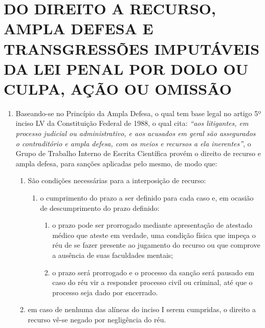 \chapter{DO DIREITO A RECURSO, AMPLA DEFESA E TRANSGRESSÕES IMPUTÁVEIS DA LEI PENAL POR DOLO OU CULPA, AÇÃO OU OMISSÃO}

\begin{enumerate}[resume, label=Art. \arabic*] %

\item Baseando-se no Princípio da Ampla Defesa, o qual tem base legal no artigo 5º inciso LV da Constituição Federal de 1988, o qual cita: \textit{“aos litigantes, em processo judicial ou administrativo, e aos acusados em geral são assegurados o contraditório e ampla defesa, com os meios e recursos a ela inerentes”}, o Grupo de Trabalho Interno de Escrita Científica provém o direito de recurso e ampla defesa, para sanções aplicadas pelo mesmo, de modo que:

\begin{enumerate}[label= \S \arabic*]
    \item São condições necessárias para a interposição de recurso:
    
    \begin{enumerate}[label=  \roman*.]
        \item o cumprimento do prazo a ser definido para cada caso e, em ocasião de descumprimento do prazo definido:
        
        \begin{enumerate}[]
            \item o prazo pode ser prorrogado mediante apresentação de atestado médico que ateste em verdade, uma condição física que impeça o réu de se fazer presente ao jugamento do recurso ou que comprove a ausência de suas faculdades mentais;
            
            \item o prazo será prorrogado e o processo da sanção será pausado em caso do réu vir a responder processo civil ou criminal, até que o processo seja dado por encerrado.
            
        \end{enumerate}
        
    \end{enumerate}
        \item em caso de nenhuma das alíneas do inciso I serem cumpridas, o direito a recurso vê-se negado por negligência do réu.
\end{enumerate}


\end{enumerate}
